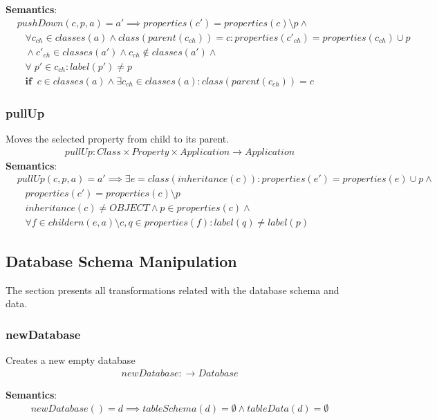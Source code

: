 \documentclass[10pt]{article}
\begin{document}
\noindent \textbf{Semantics}:
\begin{align}
& pushDown(c, p, a) = a' \implies properties(c') = properties(c) \setminus p \land \nonumber \\ 
& \;\;\; \forall c_{ch} \in classes(a) \land class(parent(c_{ch})) = c : properties(c'_{ch}) = properties(c_{ch}) \cup p \nonumber \\
& \;\;\;\land c'_{ch} \in classes(a') \land c_{ch} \notin classes(a') \land \nonumber \\
& \;\;\; \forall \; p' \in c_{ch} : label(p') \neq p \nonumber \\
& \;\;\; \mathbf{if}  \;\; c \in classes(a) \land \exists c_{ch} \in classes(a) : class(parent(c_{ch})) = c
\end{align}


\subsubsection{pullUp}
Moves the selected property from child to its parent.
\begin{align}
pullUp: Class \times Property \times Application \rightarrow Application
\end{align}
\noindent \textbf{Semantics}:
\begin{align}
& pullUp(c, p, a) = a' \implies \exists e = class(inheritance(c)) : properties(e') = properties(e) \cup p \land \nonumber \\
& \;\;\;  properties(c') = properties(c) \setminus p \nonumber \\
& \;\;\; inheritance(c) \neq OBJECT \land p \in properties(c) \land \nonumber \\
& \;\;\; \forall f \in childern(e,a) \setminus c, q \in properties(f) : label(q) \neq label(p) 
\end{align}

\subsection{Database Schema Manipulation}
The section presents all transformations related with the database schema and data.
\subsubsection{newDatabase}
Creates a new empty database
\begin{align}
newDatabase: \rightarrow Database 
\end{align}

\noindent \textbf{Semantics}:
\begin{align}
newDatabase() = d \implies tableSchema(d) = \emptyset \land tableData(d) = \emptyset
\end{align}
\end{document}
